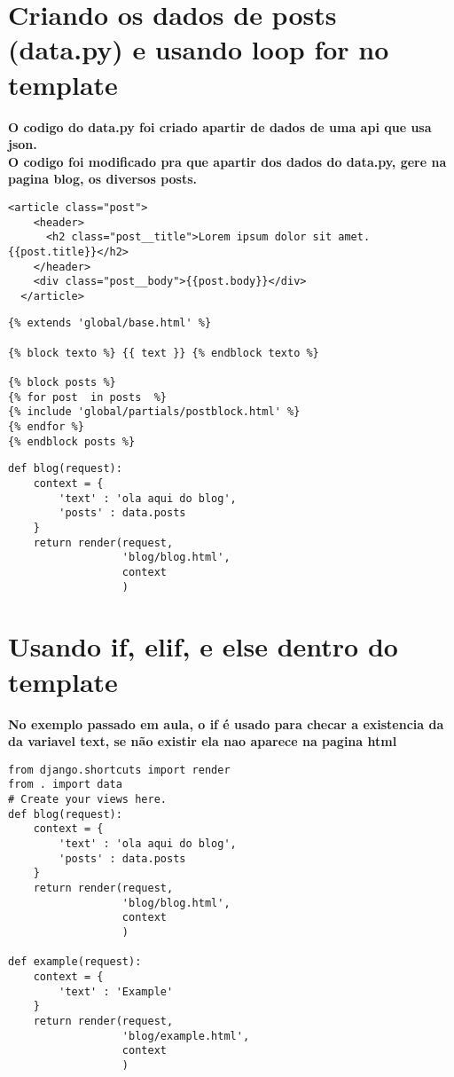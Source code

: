 \documentclass{article}
\begin{document}
\section{Criando os dados de posts (data.py) e usando loop for no template}
\textbf{O codigo do data.py foi criado apartir de dados de uma api que usa json.}\\
\textbf{O codigo foi modificado pra que apartir dos dados do data.py, gere na pagina blog, os diversos posts.}
\begin{lstlisting}[style=djangohtml, caption={base/global/partials/postblock.htmll}]
    <article class="post">
    <header>
      <h2 class="post__title">Lorem ipsum dolor sit amet.{{post.title}}</h2>
    </header>
    <div class="post__body">{{post.body}}</div>
  </article>
\end{lstlisting}

\begin{lstlisting}[style=djangohtml, caption={blog/templates/blog/blog.html}]
{% extends 'global/base.html' %}

{% block texto %} {{ text }} {% endblock texto %}

{% block posts %}
{% for post  in posts  %}
{% include 'global/partials/postblock.html' %}
{% endfor %}
{% endblock posts %} 
\end{lstlisting}

\begin{lstlisting}[style=pythonStyle, caption={blog/views.py}]
    def blog(request):
    context = {
        'text' : 'ola aqui do blog',
        'posts' : data.posts
    }
    return render(request,
                  'blog/blog.html', 
                  context
                  )

\end{lstlisting}

\section{Usando if, elif, e else dentro do template}
\textbf{No exemplo passado em aula, o if é usado para checar a existencia da da variavel text, se não existir ela nao aparece na pagina html}

\begin{lstlisting}[style=pythonStyle, caption={blog/views.py}]
    from django.shortcuts import render
from . import data
# Create your views here.
def blog(request):
    context = {
        'text' : 'ola aqui do blog',
        'posts' : data.posts
    }
    return render(request,
                  'blog/blog.html', 
                  context
                  )

def example(request):
    context = {
        'text' : 'Example'
    }
    return render(request, 
                  'blog/example.html', 
                  context
                  )

\end{lstlisting}
\end{document}
